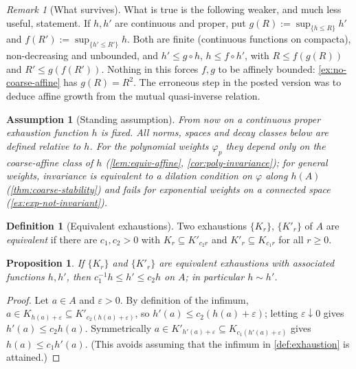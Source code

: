 \documentclass[11pt,a4paper]{article}
\numberwithin{equation}{section}
\theoremstyle{plain}
\newtheorem{proposition}[theorem]{Proposition}
\newtheorem{assumption}[theorem]{Assumption}
\theoremstyle{definition}
\newtheorem{definition}[theorem]{Definition}
\theoremstyle{remark}
\newtheorem{remark}[theorem]{Remark}
\begin{document}
\begin{remark}[What survives]\label{rem:what-survives}
What is true is the following weaker, and much less useful, statement. If $h,h'$ are
continuous and proper, put $g(R):=\sup_{\{h\le R\}}h'$ and $f(R'):=\sup_{\{h'\le R'\}}h$.
Both are finite (continuous functions on compacta), non-decreasing and unbounded, and
$h'\le g\circ h$, $h\le f\circ h'$, with $R\le f(g(R))$ and $R'\le g(f(R'))$. Nothing in
this forces $f,g$ to be affinely bounded: \cref{ex:no-coarse-affine} has $g(R)=R^{2}$.
The erroneous step in the posted version was to deduce affine growth from the mutual
quasi-inverse relation.
\end{remark}

\begin{assumption}[Standing assumption]\label{ass:standing}
From now on a continuous proper exhaustion function $h$ is \emph{fixed}. All norms,
spaces and decay classes below are defined relative to $h$. For the polynomial weights
$\varphi_p$ they depend only on the coarse-affine class of $h$ (\cref{lem:equiv-affine},
\cref{cor:poly-invariance}); for general weights, invariance is equivalent to a dilation
condition on $\varphi$ along $h(A)$ (\cref{thm:coarse-stability}) and \emph{fails} for
exponential weights on a connected space (\cref{ex:exp-not-invariant}).
\end{assumption}

\begin{definition}[Equivalent exhaustions]\label{def:equiv-exh}
Two exhaustions $\{K_r\}$, $\{K'_r\}$ of $A$ are \emph{equivalent} if there are
$c_1,c_2>0$ with $K_r\subseteq K'_{c_2r}$ and $K'_r\subseteq K_{c_1r}$ for all $r\ge0$.
\end{definition}

\begin{proposition}\label{prop:equiv-functions}
If $\{K_r\}$ and $\{K'_r\}$ are equivalent exhaustions with associated functions $h,h'$,
then $c_1^{-1}h\le h'\le c_2 h$ on $A$; in particular $h\sim h'$.
\end{proposition}

\begin{proof}
Let $a\in A$ and $\varepsilon>0$. By definition of the infimum, $a\in K_{h(a)+\varepsilon}
\subseteq K'_{c_2(h(a)+\varepsilon)}$, so $h'(a)\le c_2(h(a)+\varepsilon)$; letting
$\varepsilon\downarrow0$ gives $h'(a)\le c_2h(a)$. Symmetrically
$a\in K'_{h'(a)+\varepsilon}\subseteq K_{c_1(h'(a)+\varepsilon)}$ gives $h(a)\le c_1h'(a)$.
(This avoids assuming that the infimum in \cref{def:exhaustion} is attained.)
\end{proof}
\end{document}
